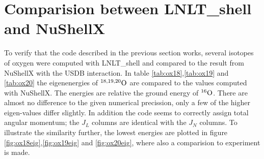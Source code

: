 \section{Comparision between LNLT\_shell and NuShellX}

To verify that the code described in the previous section works, several isotopes of oxygen were computed with LNLT\_shell and compared to the result from NuShellX with the USDB interaction. In table \ref{tab:ox18},\ref{tab:ox19} and \ref{tab:ox20} the eigenenergies of \(^{18,19,20}\rm{O}\) are compared to the values computed with NuShellX. The energies are relative the ground energy of \(^{16}\rm{O}\). There are almost no difference to the given numerical precission, only a few of the higher eigen-values differ slightly. In addition the code seems to correctly assign total angular momentum; the \(J_L\) columns are identical with the \(J_N\) columns. To illustrate the similarity further, the lowest energies are plotted in figure \ref{fig:ox18eig},\ref{fig:ox19eig} and \ref{fig:ox20eig}, where also a comparision to experiment is made.

\onecolumngrid


